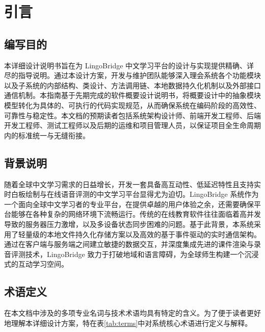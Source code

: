 \chapter{引言}

\section{编写目的}
本详细设计说明书旨在为 LingoBridge 中文学习平台的设计与实现提供精确、详尽的指导说明。通过本设计方案，开发与维护团队能够深入理会系统各个功能模块以及子系统的内部结构、类设计、方法调用链、本地数据持久化机制以及外部接口通信机制。本指南基于先期完成的软件概要设计说明书，将概要设计中的抽象模块模型转化为具体的、可执行的代码实现规范，从而确保系统在编码阶段的高效性、可靠性与稳定性。本文档的预期读者包括系统架构设计师、前端开发工程师、后端开发工程师、测试工程师以及后期的运维和项目管理人员，以保证项目全生命周期内的标准统一与无缝衔接。

\section{背景说明}
随着全球中文学习需求的日益增长，开发一套具备高互动性、低延迟特性且支持实时白板绘制与在线语音评测的中文学习平台显得尤为迫切。LingoBridge 系统作为一个面向全球中文学习者的专业平台，在提供卓越的用户体验之余，还需要确保平台能够在各种复杂的网络环境下流畅运行。传统的在线教育软件往往面临着高并发导致的服务器压力激增，以及多设备状态同步困难的问题。基于此背景，本系统采用了轻量级的本地文件持久化存储方案以及高效的基于事件驱动的实时通信架构。通过在客户端与服务端之间建立敏捷的数据交互，并深度集成先进的课件渲染与录音评测技术，LingoBridge 致力于打破地域和语言障碍，为全球师生构建一个沉浸式的互动学习空间。

\section{术语定义}
在本文档中涉及的多项专业名词与技术术语均具有特定的含义。为了便于读者更好地理解本详细设计方案，特在表\ref{tab:terms}中对系统核心术语进行定义与解释。

